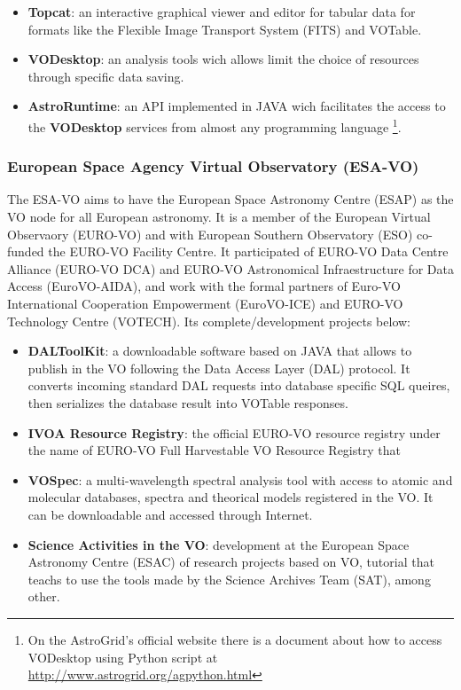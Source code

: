 \begin{itemize}
\item \textbf{Topcat}:
an interactive graphical viewer and editor for tabular data for formats like the
Flexible Image Transport System (FITS) and VOTable.

\item \textbf{VODesktop}:
an analysis tools wich allows limit the choice of resources through specific
data saving.

\item \textbf{AstroRuntime}:
an API implemented in JAVA wich facilitates the access to the \textbf{VODesktop}
services from almost any programming language \footnote{On the AstroGrid's
official website there is a document about how to access VODesktop using Python
script at \url{http://www.astrogrid.org/agpython.html}}.
\end{itemize}

\subsubsection{European Space Agency Virtual Observatory (ESA-VO)}
The ESA-VO \cite{website:esa-vo-home} aims to have the European Space Astronomy
Centre (ESAP) as the VO node for all European astronomy. It is a member of the
European Virtual Observaory (EURO-VO) and with European Southern Observatory
(ESO) co-funded the EURO-VO Facility Centre. It participated of EURO-VO Data
Centre Alliance (EURO-VO DCA) and EURO-VO Astronomical Infraestructure for Data
Access (EuroVO-AIDA), and work with the formal partners of Euro-VO International
Cooperation Empowerment (EuroVO-ICE) and EURO-VO Technology Centre (VOTECH). Its
complete/development projects below:

\begin{itemize}
\item \textbf{DALToolKit}:
a downloadable software based on JAVA that allows to publish in the VO following
the Data Access Layer (DAL) protocol. It converts incoming standard DAL requests
into database specific SQL queires, then serializes the database result into
VOTable responses. 

\item \textbf{IVOA Resource Registry}:
the official EURO-VO resource registry under the name of EURO-VO Full
Harvestable VO Resource Registry that 

\item \textbf{VOSpec}:
a multi-wavelength spectral analysis tool with access to atomic and molecular
databases, spectra and theorical models registered in the VO. It can be
downloadable and accessed through Internet.

\item \textbf{Science Activities in the VO}:
development at the European Space Astronomy Centre (ESAC) of research projects
based on VO, tutorial that teachs to use the tools made by the Science Archives
Team (SAT), among other.
\end{itemize}

